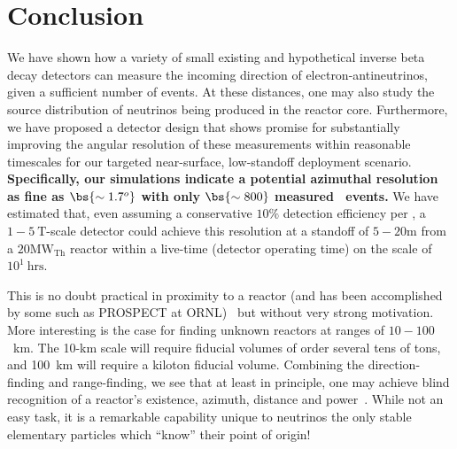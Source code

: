 \section{\label{sec:concl}Conclusion}

We have shown how a variety of small existing and hypothetical inverse beta decay detectors can measure the incoming direction of electron-antineutrinos, given a sufficient number of events.
At these distances, one may also study the source distribution of neutrinos being produced in the reactor core. 
Furthermore, we have proposed a detector design that shows promise for substantially improving the angular resolution of these measurements within reasonable timescales for our targeted near-surface, low-standoff deployment scenario.
\textbf{Specifically, our simulations indicate a potential azimuthal resolution as fine as $\bs{\sim1.7^{o}}$ with only $\bs{\sim800}$ measured \ibd\ events.}
We have estimated that, even assuming a conservative $10\%$ detection efficiency per \ibd, a $1-5~\mathrm{T}$-scale detector could achieve this resolution at a standoff of $5-20\mathrm{m}$ from a $20\mathrm{MW_{Th}}$ reactor within a live-time (detector operating time) on the scale of $10^1~\mathrm{hrs}$.

This is no doubt practical in proximity to a reactor (and has been accomplished by some such as PROSPECT at ORNL)~\cite{} but without very strong motivation.
More interesting is the case for finding unknown reactors at ranges of $10-100$~km.
The 10-km scale will require fiducial volumes of order several tens of tons, and 100~km will require a kiloton fiducial volume.
Combining the direction-finding and range-finding, we see that at least in principle, one may achieve blind recognition of a reactor's existence, azimuth, distance and power~\cite{}. %
While not an easy task, it is a remarkable capability unique to neutrinos \dash the only stable elementary particles which ``know'' their point of origin!

~